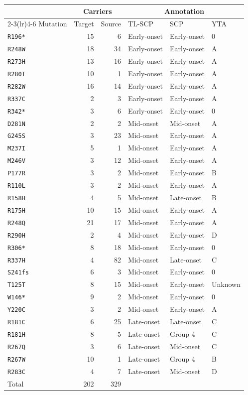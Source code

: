 \begingroup
\fontsize{9.5}{11.4}\selectfont
\renewcommand{\arraystretch}{1}
\setlength{\tabcolsep}{6pt}
\begin{tabular*}{0.98\textwidth}{@{\extracolsep{\fill}}lrrlll@{}}
\toprule
& \multicolumn{2}{c}{Carriers} & \multicolumn{3}{c}{Annotation} \\
\cmidrule(lr){2-3}\cmidrule(lr){4-6}
Mutation & Target & Source & TL-SCP & SCP & YTA \\
\midrule
\texttt{R196*} & 15 & 6 & Early-onset & Early-onset & 0 \\
\texttt{R248W} & 18 & 34 & Early-onset & Early-onset & A \\
\texttt{R273H} & 13 & 16 & Early-onset & Early-onset & A \\
\texttt{R280T} & 10 & 1 & Early-onset & Early-onset & A \\
\texttt{R282W} & 16 & 14 & Early-onset & Early-onset & A \\
\texttt{R337C} & 2 & 3 & Early-onset & Early-onset & A \\
\texttt{R342*} & 3 & 6 & Early-onset & Early-onset & 0 \\
\addlinespace[2pt]
\texttt{D281N} & 2 & 2 & Mid-onset & Mid-onset & A \\
\texttt{G245S} & 3 & 23 & Mid-onset & Early-onset & A \\
\texttt{M237I} & 5 & 1 & Mid-onset & Early-onset & A \\
\texttt{M246V} & 3 & 12 & Mid-onset & Early-onset & A \\
\texttt{P177R} & 3 & 2 & Mid-onset & Early-onset & B \\
\texttt{R110L} & 3 & 2 & Mid-onset & Early-onset & A \\
\texttt{R158H} & 4 & 5 & Mid-onset & Late-onset & B \\
\texttt{R175H} & 10 & 15 & Mid-onset & Early-onset & A \\
\texttt{R248Q} & 21 & 17 & Mid-onset & Early-onset & A \\
\texttt{R290H} & 2 & 4 & Mid-onset & Early-onset & D \\
\texttt{R306*} & 8 & 18 & Mid-onset & Early-onset & 0 \\
\texttt{R337H} & 4 & 82 & Mid-onset & Late-onset & C \\
\texttt{S241fs} & 6 & 3 & Mid-onset & Early-onset & 0 \\
\texttt{T125T} & 8 & 15 & Mid-onset & Early-onset & Unknown \\
\texttt{W146*} & 9 & 2 & Mid-onset & Early-onset & 0 \\
\texttt{Y220C} & 3 & 2 & Mid-onset & Early-onset & A \\
\addlinespace[2pt]
\texttt{R181C} & 6 & 25 & Late-onset & Late-onset & C \\
\texttt{R181H} & 8 & 5 & Late-onset & Group 4 & C \\
\texttt{R267Q} & 3 & 6 & Late-onset & Mid-onset & C \\
\texttt{R267W} & 10 & 1 & Late-onset & Group 4 & B \\
\texttt{R283C} & 4 & 7 & Late-onset & Mid-onset & D \\
\midrule
Total & 202 & 329 & & & \\
\bottomrule
\end{tabular*}
\endgroup
